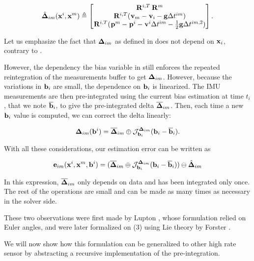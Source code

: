 \begin{align}
    \hat{{\bm \Delta}}_{im}({\bf x}^i, {\bf x}^m) \triangleq 
    \begin{bmatrix}
    \prescript{}{}{{\bf R}}_{}^{i,T} \prescript{}{}{{\bf R}}_{}^{m}  \\
    \prescript{}{}{{\bf R}}_{}^{i,T} (\prescript{}{}{{\bf v}}_{m} - \prescript{}{}{{\bf v}}_{i} - {\bf g} \Delta t^{im})  \\
    \prescript{}{}{{\bf R}}_{}^{i,T}(\prescript{}{}{{\bf p}}_{}^m - \prescript{}{}{{\bf p}}_{}^i - \prescript{}{}{{\bf v}}_{}^i \Delta t^{im} - \frac{1}{2} {\bf g} \Delta t^{im,2})
    \end{bmatrix}.
\end{align}

%
Let us emphasize the fact that ${\bm \Delta}_{im}$ as defined in  does not depend on ${\bf x}_i$, contrary to . 

However, the dependency the bias variable in  still enforces the repeated reintegration of the measurements buffer to get ${\bm \Delta}_{im}$. 
However, because the variations in ${\bf b}_i$ are small, the dependence on ${\bf b}_i$ is linearized. The IMU measurements are then pre-integrated using the current bias estimation at time $t_i$, that we note $\overline{{\bf b}}_i$, to give the pre-integrated delta $\overline{{\bm \Delta}}_{im}$.
Then, each time a new ${\bf b}_i$ value is computed, we can correct the delta linearly:

\begin{align}
    {\bm \Delta}_{im}({\bf b}^i) = \overline{{\bm \Delta}}_{im} \oplus {\mathcal{J}^{{\bm \Delta}_{im}}_{{\bf b}_i}}({\bf b}_i-\overline{{\bf b}}_i).
\end{align}

With all these considerations, our estimation error can be written as

\begin{align}
    {\bf e}_{im}({\bf x}^i, {\bf x}^m, {\bf b}^i) = (\overline{{\bm \Delta}}_{im} \oplus {\mathcal{J}^{{\bm \Delta}_{im}}_{{\bf b}_i}}({\bf b}_i-\overline{{\bf b}}_i) ) \ominus \hat{{\bm \Delta}}_{im}
    \label{eq:preint_residual}
\end{align}

In this expression, $\overline{{\bm \Delta}}_{im}$ only depends on data and has been integrated only once. The rest of the operations are small and can be made as many times as necessary in the solver side.

These two observations were first made by Lupton \cite{lupton-09}, whose formulation relied on Euler angles, and were later formalized on \SO(3) using Lie theory
by Forster \cite{forster2017-TRO}. 

We will now show how this formulation can be generalized to other high rate sensor by abstracting a recursive implementation of the pre-integration.



